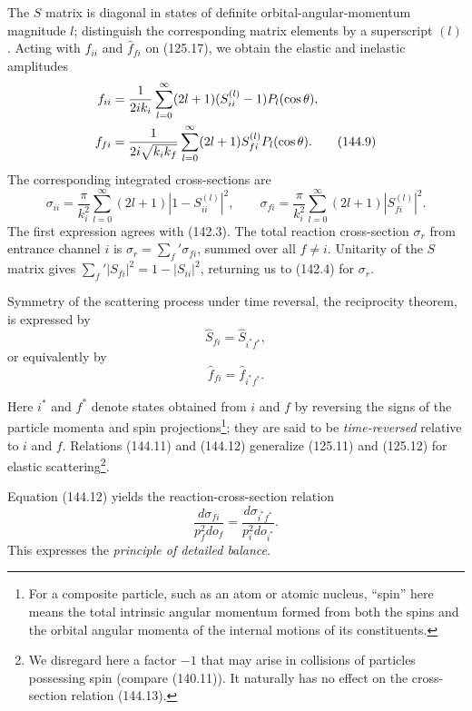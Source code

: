 The $S$ matrix is diagonal in states of definite orbital-angular-momentum magnitude $l$; distinguish the corresponding matrix elements by a superscript $(l)$. Acting with $\widehat f_{ii}$ and $\widehat f_{fi}$ on (125.17), we obtain the elastic and inelastic amplitudes
\begin{align}
 f_{ii}&=\frac1{2ik_i}\sum_{l=0}^{\infty}(2l+1)(S_{ii}^{(l)}-1)P_l(\cos\theta),\notag\\
 f_{fi}&=\frac1{2i\sqrt{k_ik_f}}\sum_{l=0}^{\infty}(2l+1)S_{fi}^{(l)}P_l(\cos\theta).
 \tag{144.9}
\end{align}
The corresponding integrated cross-sections are
\begin{equation}
 \sigma_{ii}=\frac\pi{k_i^2}\sum_{l=0}^{\infty}(2l+1)|1-S_{ii}^{(l)}|^2,
 \qquad
 \sigma_{fi}=\frac\pi{k_i^2}\sum_{l=0}^{\infty}(2l+1)|S_{fi}^{(l)}|^2.
 \tag{144.10}
\end{equation}
The first expression agrees with (142.3). The total reaction cross-section $\sigma_r$ from entrance channel $i$ is $\sigma_r=\sum_f'\sigma_{fi}$, summed over all $f\ne i$. Unitarity of the $S$ matrix gives $\sum_f'|S_{fi}|^2=1-|S_{ii}|^2$, returning us to (142.4) for $\sigma_r$.

Symmetry of the scattering process under time reversal, the reciprocity theorem, is expressed by
\begin{equation}
 \widehat S_{fi}=\widehat S_{i^*f^*},
 \tag{144.11}
\end{equation}
or equivalently by
\begin{equation}
 \widehat f_{fi}=\widehat f_{i^*f^*}.
 \tag{144.12}
\end{equation}

Here $i^*$ and $f^*$ denote states obtained from $i$ and $f$ by reversing the signs of the particle momenta and spin projections\footnote{For a composite particle, such as an atom or atomic nucleus, ``spin'' here means the total intrinsic angular momentum formed from both the spins and the orbital angular momenta of the internal motions of its constituents.}; they are said to be \emph{time-reversed} relative to $i$ and $f$. Relations (144.11) and (144.12) generalize (125.11) and (125.12) for elastic scattering\footnote{We disregard here a factor $-1$ that may arise in collisions of particles possessing spin (compare (140.11)). It naturally has no effect on the cross-section relation (144.13).}.

Equation (144.12) yields the reaction-cross-section relation
\begin{equation}
 \frac{d\sigma_{fi}}{p_f^2d\mathit{o}_f}
 =\frac{d\sigma_{i^*f^*}}{p_i^2d\mathit{o}_{i^*}}.
 \tag{144.13}
\end{equation}
This expresses the \emph{principle of detailed balance}.

